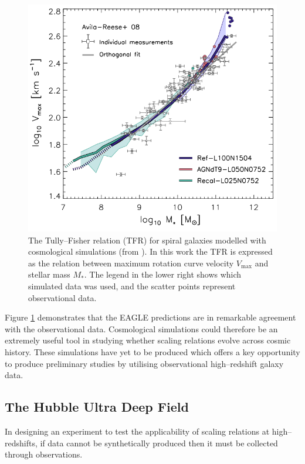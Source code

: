 \documentclass[12pt, twocolumn, nofootinbib]{revtex4-1}    %
\begin{document}
\begin{figure}
\includegraphics[width=\linewidth]{introduction/eagle_tully_fisher}
\caption{The Tully--Fisher relation (TFR) for spiral galaxies modelled with cosmological simulations (from \citealt{2015MNRAS.446..521S}). In this work the TFR is expressed as the relation between maximum rotation curve velocity $V_{\max}$ and stellar mass $M_*$. The legend in the lower right shows which simulated data was used, and the scatter points represent observational data.}
\label{fig:eagle_tully_fisher}
\end{figure}

Figure \ref{fig:eagle_tully_fisher} demonstrates that the EAGLE predictions are in remarkable agreement with the observational data. Cosmological simulations could therefore be an extremely useful tool in studying whether scaling relations evolve across cosmic history. These simulations have yet to be produced which offers a key opportunity to produce preliminary studies by utilising observational high--redshift galaxy data.

\vspace{2ex} %
\subsection{The Hubble Ultra Deep Field}
\noindent
In designing an experiment to test the applicability of scaling relations at high--redshifts, if data cannot be synthetically produced then it must be collected through observations.
\end{document}
